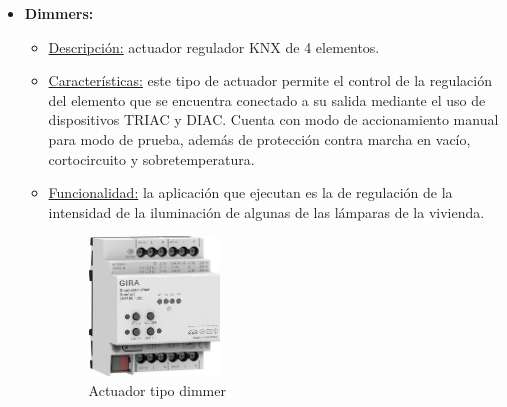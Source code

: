 \begin{itemize}
\item \textbf{Dimmers:} 
	\begin{itemize}
	\item\underline{Descripción:} actuador regulador KNX de 4 elementos.
	\item \underline{Características:} este tipo de actuador permite el control de la regulación del elemento que se encuentra conectado a su salida mediante el uso de dispositivos TRIAC y DIAC. Cuenta con modo de accionamiento manual para modo de prueba, además de protección contra marcha en vacío, cortocircuito y sobretemperatura. 
	\item \underline{Funcionalidad:} la aplicación que ejecutan es la de regulación de la intensidad de la iluminación de algunas de las lámparas de la vivienda.\\ [0,15 cm]
		\begin{figure}[h]
		\centering
		\includegraphics[width=0.35\textwidth]{figures/actuador_dimmer.jpg}   
		\caption{Actuador tipo dimmer}
		\label{fig:actuador_dimmer}
		\end{figure}
	\end{itemize} 



\end{itemize}
